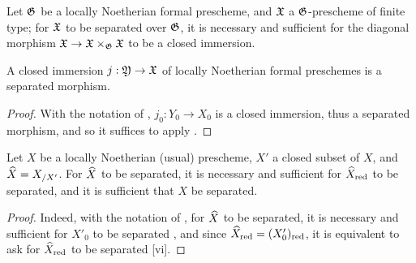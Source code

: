 \begin{cor}[10.15.5]
\label{1.10.15.5}
Let $\mathfrak{G}$ be a locally Noetherian formal prescheme, and $\mathfrak{X}$ a $\mathfrak{G}$-prescheme of finite type;
for $\mathfrak{X}$ to be separated over $\mathfrak{G}$, it is necessary and sufficient for the diagonal morphism $\fk{X}\to\fk{X}\times_\fk{G}\fk{X}$ to be a closed immersion.
\end{cor}

\begin{prop}[10.15.6]
\label{1.10.15.6}
A closed immersion $j:\fk{Y}\to\fk{X}$ of locally Noetherian formal preschemes is a separated morphism.
\end{prop}

\begin{proof}
\label{proof-1.10.15.6}
With the notation of , $j_0:Y_0\to X_0$ is a closed immersion, thus a separated morphism, and so it suffices to apply .
\end{proof}

\begin{prop}[10.15.7]
\label{1.10.15.7}
Let $X$ be a locally Noetherian (usual) prescheme, $X'$ a closed subset of $X$, and $\widehat{X}=X_{/X'}$.
For $\widehat{X}$ to be separated, it is necessary and sufficient for $\widehat{X}_\mathrm{red}$ to be separated, and it is sufficient that $X$ be separated.
\end{prop}

\begin{proof}
\label{proof-1.10.15.7}
Indeed, with the notation of , for $\widehat{X}$ to be separated, it is necessary and sufficient for $X'_0$ to be separated , and since $\widehat{X}_\mathrm{red}=(X'_0)_\mathrm{red}$, it is equivalent to ask for $\widehat{X}_\mathrm{red}$ to be separated [vi].
\end{proof}
